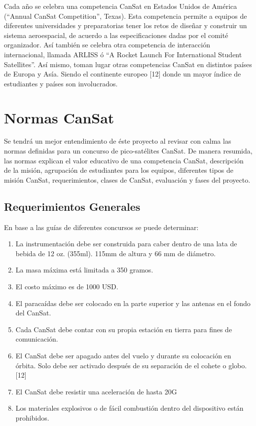 Cada a\~{n}o se celebra una competencia CanSat en Estados Unidos de Am\'{e}rica (“Annual CanSat Competition”, Texas). Esta competencia permite a equipos de diferentes universidades y preparatorias tener los retos de dise\~{n}ar y construir un sistema aeroespacial, de acuerdo a las especificaciones dadas por el comit\'{e} organizador. As\'{i} tambi\'{e}n se celebra otra competencia de interacci\'{o}n internacional, llamada ARLISS \'{o} “A Rocket Launch For International Student Satellites”.
As\'{i} mismo, toman lugar otras competencias CanSat en distintos pa\'{i}ses de Europa y As\'{i}a. Siendo el continente europeo [12] donde un mayor \'{i}ndice de estudiantes y pa\'{i}ses son involucrados.



\section{Normas CanSat} %
Se tendr\'{a} un mejor entendimiento de \'{e}ste proyecto al revisar con calma las normas definidas para un concurso de pico-sat\'{e}lites CanSat. De manera resumida, las normas explican el valor educativo de una competencia CanSat, descripci\'{o}n de la misi\'{o}n, agrupaci\'{o}n de estudiantes para los equipos, diferentes tipos de misi\'{o}n CanSat, requerimientos, clases de CanSat, evaluaci\'{o}n y fases del proyecto.


\subsection{Requerimientos Generales}
En base a las gu\'{i}as de diferentes concursos se puede determinar:
\begin{enumerate}
\item La instrumentaci\'{o}n debe ser construida para caber dentro de una lata de bebida de 12 oz. (355ml). 115mm de altura y 66 mm de di\'{a}metro.
\item La masa m\'{a}xima est\'{a} limitada a 350 gramos.
\item El costo m\'{a}ximo es de 1000 USD.
\item El paraca\'{i}das debe ser colocado en la parte superior y las antenas en el fondo del CanSat.
\item Cada CanSat debe contar con su propia estaci\'{o}n en tierra para fines de comunicaci\'{o}n.
\item El CanSat debe ser apagado antes del vuelo y durante su colocaci\'{o}n en \'{o}rbita. Solo debe ser activado despu\'{e}s de su separaci\'{o}n de el cohete o globo. [12]
\item El CanSat debe resistir una aceleraci\'{o}n de hasta 20G
\item Los materiales explosivos o de f\'{a}cil combusti\'{o}n dentro del dispositivo est\'{a}n prohibidos.
\end{enumerate}

